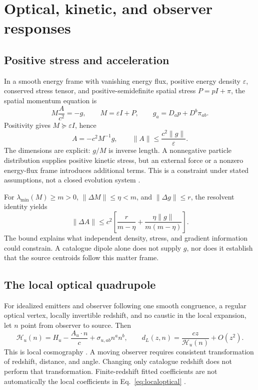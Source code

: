 \section{Optical, kinetic, and observer responses}
\label{sec:optics}

\subsection{Positive stress and acceleration}

In a smooth energy frame with vanishing energy flux, positive energy density $\varepsilon$, conserved stress tensor, and positive-semidefinite spatial stress $P=pI+\pi$, the spatial momentum equation is
\begin{equation}
 M\frac{A}{c^2}=-g,\qquad
 M=\varepsilon I+P,\qquad
 g_a=D_ap+D^b\pi_{ab}.
 \label{eq:acceleration}
\end{equation}
Positivity gives $M\succeq\varepsilon I$, hence
\begin{equation}
 A=-c^2M^{-1}g,\qquad \|A\|\leq\frac{c^2\|g\|}{\varepsilon}.
 \label{eq:accelbound}
\end{equation}
The dimensions are explicit: $g/M$ is inverse length. A nonnegative particle distribution supplies positive kinetic stress, but an external force or a nonzero energy-flux frame introduces additional terms. This is a constraint under stated assumptions, not a closed evolution system \cite{ClarksonMaartens2026}.

For $\lambda_{\min}(M)\geq m>0$, $\|\Delta M\|\leq\eta<m$, and $\|\Delta g\|\leq r$, the resolvent identity yields
\begin{equation}
 \|\Delta A\|\leq c^2\left[
 \frac{r}{m-\eta}+\frac{\eta\|g\|}{m(m-\eta)}\right].
 \label{eq:accelperturb}
\end{equation}
The bound explains what independent density, stress, and gradient information could constrain. A catalogue dipole alone does not supply $g$, nor does it establish that the source centroids follow this matter frame.

\subsection{The local optical quadrupole}

For idealized emitters and observer following one smooth congruence, a regular optical vertex, locally invertible redshift, and no caustic in the local expansion, let $n$ point from observer to source. Then
\begin{equation}
 \mathcal H_u(n)=H_u-\frac{A_u\cdot n}{c}+\sigma_{u,ab}n^an^b,
 \qquad d_L(z,n)=\frac{cz}{\mathcal H_u(n)}+O(z^2).
 \label{eq:localoptical}
\end{equation}
This is local cosmography \cite{Heinesen2021,Maartens2024}. A moving observer requires consistent transformation of redshift, distance, and angle. Changing only catalogue redshift does not perform that transformation. Finite-redshift fitted coefficients are not automatically the local coefficients in Eq.~\eqref{eq:localoptical} \cite{Bendtsen2026}.

